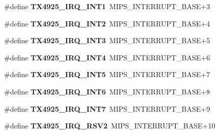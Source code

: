 \begin{DoxyCompactItemize}
\mbox{\label{group__bsp__interrupt_ga80fa7173aee08b188a89a9682d24a6b1}} 
\#define {\bfseries T\+X4925\+\_\+\+I\+R\+Q\+\_\+\+I\+N\+T1}~M\+I\+P\+S\+\_\+\+I\+N\+T\+E\+R\+R\+U\+P\+T\+\_\+\+B\+A\+SE+3
\item 
\mbox{\label{group__bsp__interrupt_ga9dc56e68dcc47f0f1085ad53f101320a}} 
\#define {\bfseries T\+X4925\+\_\+\+I\+R\+Q\+\_\+\+I\+N\+T2}~M\+I\+P\+S\+\_\+\+I\+N\+T\+E\+R\+R\+U\+P\+T\+\_\+\+B\+A\+SE+4
\item 
\mbox{\label{group__bsp__interrupt_gaafed7c74c08222f6cf754152a7407c70}} 
\#define {\bfseries T\+X4925\+\_\+\+I\+R\+Q\+\_\+\+I\+N\+T3}~M\+I\+P\+S\+\_\+\+I\+N\+T\+E\+R\+R\+U\+P\+T\+\_\+\+B\+A\+SE+5
\item 
\mbox{\label{group__bsp__interrupt_gae92a03747b5d568430af768829374ecc}} 
\#define {\bfseries T\+X4925\+\_\+\+I\+R\+Q\+\_\+\+I\+N\+T4}~M\+I\+P\+S\+\_\+\+I\+N\+T\+E\+R\+R\+U\+P\+T\+\_\+\+B\+A\+SE+6
\item 
\mbox{\label{group__bsp__interrupt_ga2904b665d0da0250216b22729b710035}} 
\#define {\bfseries T\+X4925\+\_\+\+I\+R\+Q\+\_\+\+I\+N\+T5}~M\+I\+P\+S\+\_\+\+I\+N\+T\+E\+R\+R\+U\+P\+T\+\_\+\+B\+A\+SE+7
\item 
\mbox{\label{group__bsp__interrupt_ga35ef716d6a35eb4413e047b00893e61d}} 
\#define {\bfseries T\+X4925\+\_\+\+I\+R\+Q\+\_\+\+I\+N\+T6}~M\+I\+P\+S\+\_\+\+I\+N\+T\+E\+R\+R\+U\+P\+T\+\_\+\+B\+A\+SE+8
\item 
\mbox{\label{group__bsp__interrupt_ga5264472aae7c5411f6c59c8d295d393c}} 
\#define {\bfseries T\+X4925\+\_\+\+I\+R\+Q\+\_\+\+I\+N\+T7}~M\+I\+P\+S\+\_\+\+I\+N\+T\+E\+R\+R\+U\+P\+T\+\_\+\+B\+A\+SE+9
\item 
\mbox{\label{group__bsp__interrupt_gadc3d03a0deb13f95a4b002928395574a}} 
\#define {\bfseries T\+X4925\+\_\+\+I\+R\+Q\+\_\+\+R\+S\+V2}~M\+I\+P\+S\+\_\+\+I\+N\+T\+E\+R\+R\+U\+P\+T\+\_\+\+B\+A\+SE+10
\item 
\mbox{\label{group__bsp__interrupt_ga89df8298cabfffcd1c5dfac89e7c4408}} 

\end{DoxyCompactItemize}
